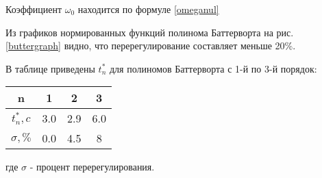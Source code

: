 Коэффициент $\omega_0$ находится по формуле \eqref{omeganul}

Из графиков нормированных функций полинома Баттерворта на рис. \ref{buttergraph} видно, что перерегулирование составляет меньше 20\%.

В таблице приведены $t_n^*$ для полиномов Баттерворта с 1-й по 3-й порядок:
\begin{center}
\begin{tabular}{ |c|c|c|c| } 
 \hline
 n &  1 & 2 & 3  \\ 
 \hline
 $t_n^*, c$ &  3.0 & 2.9 & 6.0  \\ 
 \hline
 $\sigma, \%$ &  0.0 & 4.5 & 8  \\ 
 \hline
\end{tabular}
\end{center}
где $\sigma$ - процент перерегулирования. 
